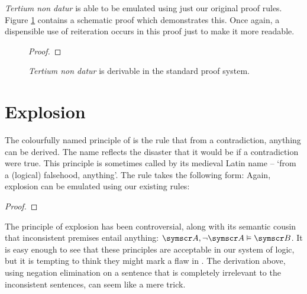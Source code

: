 \emph{Tertium non datur} is able to be emulated using just our original proof rules. Figure \ref{fig.tndder} contains a schematic proof which demonstrates this. Once again, a dispensible use of reiteration occurs in this proof just to make it more readable.
\begin{figure}
\begin{proof}
		\open
		\close
		\open
		\close
		\have[\ ]{}{\vdots}
		\open
			\open
				\close
			\close
	\end{proof}
	\caption{\emph{Tertium non datur} is derivable in the standard proof system.\label{fig.tndder}}
\end{figure}

\section{Explosion}\label{exfalso}

The colourfully named principle of  is the rule that from a contradiction, anything can be derived. The name reflects the disaster that it would be if a contradiction were true. This principle is sometimes called by its medieval Latin name  – `from a (logical) falsehood, anything'. The rule takes the following form:
Again, explosion can be emulated using our existing rules:
\begin{proof}
	\open
		\close
\end{proof}

The principle of explosion has been controversial, along with its semantic cousin that inconsistent premises entail anything: $\meta{A},\enot\meta{A}\vDash\meta{B}$. It is easy enough to see that these principles are acceptable in our system of logic, but it is tempting to think they might mark a flaw in \TFL. The derivation above, using negation elimination on a sentence that is completely irrelevant to the inconsistent sentences, can seem like a mere trick. 


